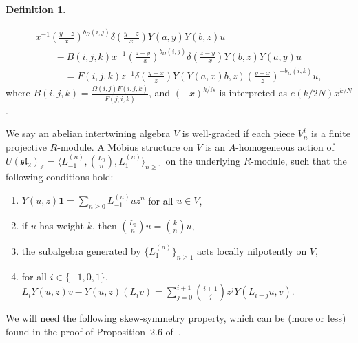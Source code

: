 \documentclass[11pt]{article}
\newcommand{\bZ}{\mathbb{Z}}
\newcommand{\unit}{\mathbf{1}}
\newcommand{\fsl}{\mathfrak{sl}}
\theoremstyle{definition}
\newtheorem{defn}[thm]{Definition}
\begin{document}
\begin{defn}
\begin{enumerate}
 \begin{gather*}
 x^{-1} \left(\frac{y-z}{x} \right)^{b_\Omega(i,j)} \delta\left(\frac{y-z}{x}\right) Y(a,y) Y(b,z) u \\
\qquad{}- B(i,j,k) x^{-1} \left(\frac{z-y}{-x} \right)^{b_\Omega(i,j)} \delta\left(\frac{z-y}{-x}\right) Y(b,z) Y(a,y) u \\
 \qquad\quad{} = F(i,j,k) z^{-1} \delta\left(\frac{y-x}{z}\right) Y(Y(a,x)b,z) \left(\frac{y-x}{z} \right)^{-b_\Omega(i,k)} u,
\end{gather*}
where $B(i,j,k) = \frac{\Omega(i,j)F(i,j,k)}{F(j,i,k)}$, and $(-x)^{k/N}$ is interpreted as $e(k/2N)x^{k/N}$.
\end{enumerate}
We say an abelian intertwining algebra $V$ is well-graded if each piece $V_n^i$ is a finite projective $R$-module. A M\"obius structure on $V$ is an $A$-homogeneous action of $U(\fsl_2)_{\bZ} = \big\langle L_{-1}^{(n)}, \binom{L_0}{n}, L_1^{(n)} \big\rangle_{n \geq 1}$ on the underlying $R$-module, such that the following conditions hold:
\begin{enumerate}\itemsep=0pt
\item[1)] $Y(u,z)\unit = \sum\limits_{n \geq 0} L_{-1}^{(n)}u z^n$ for all $u \in V$,
\item[2)] if $u$ has weight $k$, then $\binom{L_0}{n}u = \binom{k}{n}u$,
\item[3)] the subalgebra generated by $\{ L_1^{(n)} \}_{n \geq 1}$ acts locally nilpotently on $V$,
\item[4)] for all $i \in \{-1,0,1\}$, $L_i Y(u,z)v - Y(u,z)(L_i v) = \sum\limits_{j =0}^{i+1} \binom{i+1}{j} z^j Y(L_{i-j} u,v)$.
\end{enumerate}
\end{defn}

We will need the following skew-symmetry property, which can be (more or less) found in the proof of Proposition~2.6 of~\cite{GL00}.
\end{document}
